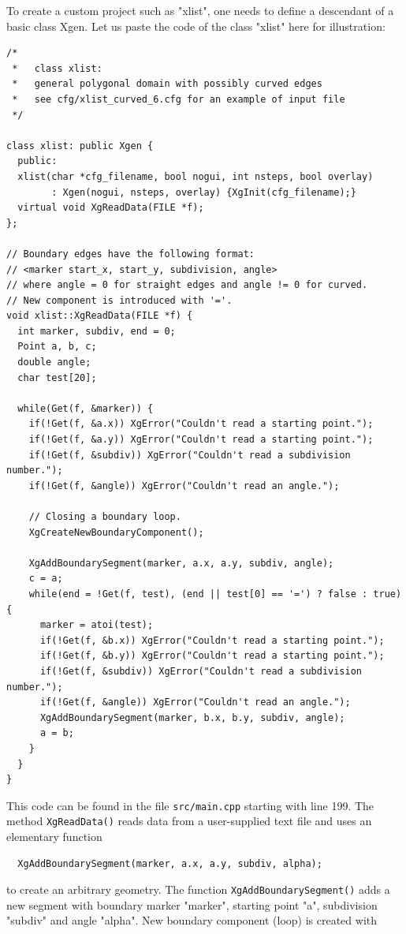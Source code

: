 \documentclass[12pt]{article}
\begin{document}
  To create a custom project such as "xlist", one needs to define 
  a descendant of a basic class Xgen. Let us paste the 
  code of the class "xlist" here for illustration: 

\begin{verbatim}
/*
 *   class xlist:
 *   general polygonal domain with possibly curved edges
 *   see cfg/xlist_curved_6.cfg for an example of input file
 */

class xlist: public Xgen {
  public:
  xlist(char *cfg_filename, bool nogui, int nsteps, bool overlay) 
        : Xgen(nogui, nsteps, overlay) {XgInit(cfg_filename);}
  virtual void XgReadData(FILE *f);
};

// Boundary edges have the following format:
// <marker start_x, start_y, subdivision, angle>
// where angle = 0 for straight edges and angle != 0 for curved.
// New component is introduced with '='.
void xlist::XgReadData(FILE *f) {
  int marker, subdiv, end = 0;
  Point a, b, c;
  double angle;
  char test[20];

  while(Get(f, &marker)) {
    if(!Get(f, &a.x)) XgError("Couldn't read a starting point.");
    if(!Get(f, &a.y)) XgError("Couldn't read a starting point.");
    if(!Get(f, &subdiv)) XgError("Couldn't read a subdivision number.");
    if(!Get(f, &angle)) XgError("Couldn't read an angle.");

    // Closing a boundary loop.
    XgCreateNewBoundaryComponent();

    XgAddBoundarySegment(marker, a.x, a.y, subdiv, angle);
    c = a;
    while(end = !Get(f, test), (end || test[0] == '=') ? false : true) {
      marker = atoi(test);
      if(!Get(f, &b.x)) XgError("Couldn't read a starting point.");
      if(!Get(f, &b.y)) XgError("Couldn't read a starting point.");
      if(!Get(f, &subdiv)) XgError("Couldn't read a subdivision number.");
      if(!Get(f, &angle)) XgError("Couldn't read an angle.");
      XgAddBoundarySegment(marker, b.x, b.y, subdiv, angle); 
      a = b;
    } 
  }
}
\end{verbatim}
This code can be found in the file {\tt src/main.cpp} starting 
with line 199. The method {\tt XgReadData()} reads data from 
a user-supplied text file and uses an elementary function 

\begin{verbatim}
  XgAddBoundarySegment(marker, a.x, a.y, subdiv, alpha);
\end{verbatim}
to create an arbitrary geometry. The function {\tt XgAddBoundarySegment()}
adds a new segment with boundary marker "marker", starting point "a", 
subdivision "subdiv" and angle "alpha". New boundary component (loop) is
created with
\end{document}

